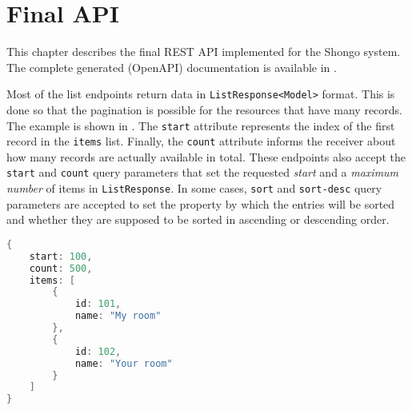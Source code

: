 \chapter{Final API} \label{cha:api}
This chapter describes the final REST API implemented for the Shongo system. The complete generated (OpenAPI) documentation is available in .

Most of the list endpoints return data in \texttt{ListResponse<Model>} format. This is done so that the pagination is possible for the resources that have many records. The example is shown in . The \texttt{start} attribute represents the index of the first record in the \texttt{items} list. Finally, the \texttt{count} attribute informs the receiver about how many records are actually available in total.
These endpoints also accept the \texttt{start} and \texttt{count} query parameters that set the requested \emph{start} and a \emph{maximum number} of items in \texttt{ListResponse}.
In some cases, \texttt{sort} and \texttt{sort-desc} query parameters are accepted to set the property by which the entries will be sorted and whether they are supposed to be sorted in ascending or descending order.

\begin{lstlisting}[language=Java, caption=ListResponse, label=lst:listresponse]
{
    start: 100,
    count: 500,
    items: [
        {
            id: 101,
            name: "My room"
        },
        {
            id: 102,
            name: "Your room"
        }
    ]
}
\end{lstlisting}










